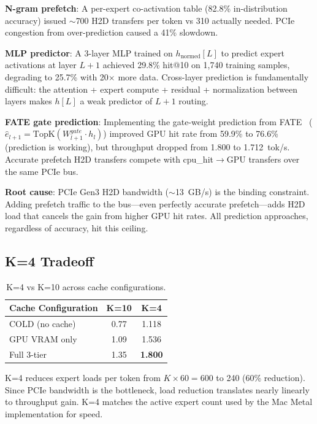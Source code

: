 \documentclass[conference]{IEEEtran}
\begin{document}
\textbf{N-gram prefetch}: A per-expert co-activation table (82.8\% in-distribution accuracy) issued $\sim$700 H2D transfers per token vs 310 actually needed. PCIe congestion from over-prediction caused a 41\% slowdown.

\textbf{MLP predictor}: A 3-layer MLP trained on $h_{\text{normed}}[L]$ to predict expert activations at layer $L+1$ achieved 29.8\% hit@10 on 1,740 training samples, degrading to 25.7\% with 20$\times$ more data. Cross-layer prediction is fundamentally difficult: the attention + expert compute + residual + normalization between layers makes $h[L]$ a weak predictor of $L+1$ routing.

\textbf{FATE gate prediction}: Implementing the gate-weight prediction from FATE~\cite{fate2025} ($\hat{e}_{l+1} = \text{TopK}(W^{gate}_{l+1} \cdot h_l)$) improved GPU hit rate from 59.9\% to 76.6\% (prediction is working), but throughput dropped from 1.800 to 1.712~tok/s. Accurate prefetch H2D transfers compete with cpu\_hit$\to$GPU transfers over the same PCIe bus.

\textbf{Root cause}: PCIe Gen3 H2D bandwidth ($\sim$13~GB/s) is the binding constraint. Adding prefetch traffic to the bus---even perfectly accurate prefetch---adds H2D load that cancels the gain from higher GPU hit rates. All prediction approaches, regardless of accuracy, hit this ceiling.

\subsection{K=4 Tradeoff}

\begin{table}[t]
\centering
\caption{K=4 vs K=10 across cache configurations.}
\label{tab:topk}
\begin{tabular}{lcc}
\toprule
Cache Configuration & K=10 & K=4 \\
\midrule
COLD (no cache) & 0.77 & 1.118 \\
GPU VRAM only & 1.09 & 1.536 \\
Full 3-tier & 1.35 & \textbf{1.800} \\
\bottomrule
\end{tabular}
\end{table}

K=4 reduces expert loads per token from $K \times 60 = 600$ to 240 (60\% reduction). Since PCIe bandwidth is the bottleneck, load reduction translates nearly linearly to throughput gain. K=4 matches the active expert count used by the Mac Metal implementation for speed.
\end{document}
